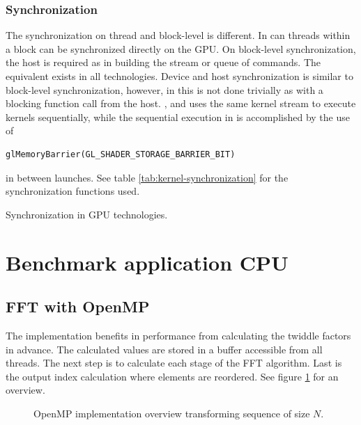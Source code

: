 \subsubsection{Synchronization}

The synchronization on thread and block-level is different. In {\CU} can threads within a block can be synchronized directly on the \gls{GPU}. On block-level synchronization, the host is required as in building the stream or queue of commands. The equivalent exists in all technologies. Device and host synchronization is similar to block-level synchronization, however, in {\DX} this is not done trivially as with a blocking function call from the host. {\CU}, {\OCL} and {\DX} uses the same kernel stream to execute kernels sequentially, while the sequential execution in {\GL} is accomplished by the use of
\begin{lstlisting}
glMemoryBarrier(GL_SHADER_STORAGE_BARRIER_BIT)
\end{lstlisting}
in between launches. See table \ref{tab:kernel-synchronization} for the synchronization functions used.

\begin{table}[H]
	\centering
	
	\caption{Synchronization in GPU technologies.}
	\label{tab:kernel-synchronization}
\end{table}

\section{Benchmark application CPU}

\subsection{FFT with OpenMP}

The {\OMP} implementation benefits in performance from calculating the twiddle factors in advance. The calculated values are stored in a buffer accessible from all threads. The next step is to calculate each stage of the \gls{FFT} algorithm. Last is the output index calculation where elements are reordered. See figure \ref{fig:omp:overview} for an overview.

\begin{figure}
	\centering
	
	\caption{OpenMP implementation overview transforming sequence of size $N$.}
	\label{fig:omp:overview}
\end{figure}

